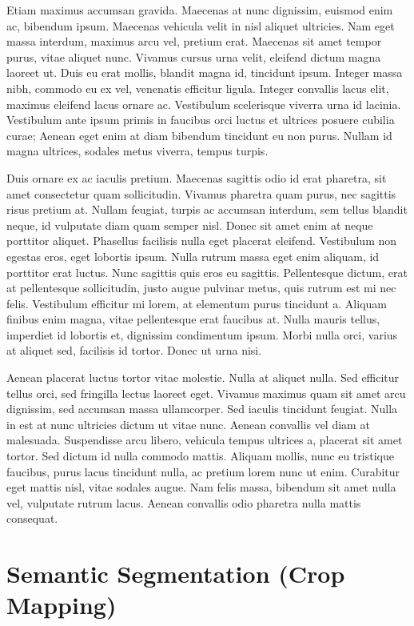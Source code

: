 \documentclass[
  letterpaper,
  DIV=11,
  numbers=noendperiod]{scrreprt}
\begin{document}
Etiam maximus accumsan gravida. Maecenas at nunc dignissim, euismod enim
ac, bibendum ipsum. Maecenas vehicula velit in nisl aliquet ultricies.
Nam eget massa interdum, maximus arcu vel, pretium erat. Maecenas sit
amet tempor purus, vitae aliquet nunc. Vivamus cursus urna velit,
eleifend dictum magna laoreet ut. Duis eu erat mollis, blandit magna id,
tincidunt ipsum. Integer massa nibh, commodo eu ex vel, venenatis
efficitur ligula. Integer convallis lacus elit, maximus eleifend lacus
ornare ac. Vestibulum scelerisque viverra urna id lacinia. Vestibulum
ante ipsum primis in faucibus orci luctus et ultrices posuere cubilia
curae; Aenean eget enim at diam bibendum tincidunt eu non purus. Nullam
id magna ultrices, sodales metus viverra, tempus turpis.

Duis ornare ex ac iaculis pretium. Maecenas sagittis odio id erat
pharetra, sit amet consectetur quam sollicitudin. Vivamus pharetra quam
purus, nec sagittis risus pretium at. Nullam feugiat, turpis ac accumsan
interdum, sem tellus blandit neque, id vulputate diam quam semper nisl.
Donec sit amet enim at neque porttitor aliquet. Phasellus facilisis
nulla eget placerat eleifend. Vestibulum non egestas eros, eget lobortis
ipsum. Nulla rutrum massa eget enim aliquam, id porttitor erat luctus.
Nunc sagittis quis eros eu sagittis. Pellentesque dictum, erat at
pellentesque sollicitudin, justo augue pulvinar metus, quis rutrum est
mi nec felis. Vestibulum efficitur mi lorem, at elementum purus
tincidunt a. Aliquam finibus enim magna, vitae pellentesque erat
faucibus at. Nulla mauris tellus, imperdiet id lobortis et, dignissim
condimentum ipsum. Morbi nulla orci, varius at aliquet sed, facilisis id
tortor. Donec ut urna nisi.

Aenean placerat luctus tortor vitae molestie. Nulla at aliquet nulla.
Sed efficitur tellus orci, sed fringilla lectus laoreet eget. Vivamus
maximus quam sit amet arcu dignissim, sed accumsan massa ullamcorper.
Sed iaculis tincidunt feugiat. Nulla in est at nunc ultricies dictum ut
vitae nunc. Aenean convallis vel diam at malesuada. Suspendisse arcu
libero, vehicula tempus ultrices a, placerat sit amet tortor. Sed dictum
id nulla commodo mattis. Aliquam mollis, nunc eu tristique faucibus,
purus lacus tincidunt nulla, ac pretium lorem nunc ut enim. Curabitur
eget mattis nisl, vitae sodales augue. Nam felis massa, bibendum sit
amet nulla vel, vulputate rutrum lacus. Aenean convallis odio pharetra
nulla mattis consequat.

\chapter{Semantic Segmentation (Crop
Mapping)}\label{semantic-segmentation-crop-mapping}
\end{document}
